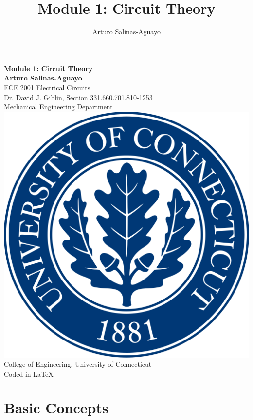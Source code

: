 \documentclass[12pt]{article}
\author{Arturo Salinas-Aguayo}
\title{Module 1: Circuit Theory}
\begin{document}
\newcommand{\closure}[2][3]{%
	{}\mkern#1mu\overline{\mkern-#1mu#2}}
\newcommand\ncoverline[1]{\mkern1mu\overline{\mkern-1mu#1\mkern-1mu}\mkern1mu}
\begin{titlepage}
	\centering
	\vspace*{3cm}
	\huge\textbf{Module 1: Circuit Theory }\\
	\vspace{5cm}
	\Large\textbf{Arturo Salinas-Aguayo}\\
	\normalsize
	ECE 2001 Electrical Circuits\\
	Dr. David J. Giblin, Section 331.660.701.810-1253\\
	Mechanical Engineering Department
	\vfill
	\includegraphics[scale=0.1]{uconnlogo}\\
	College of Engineering, University of Connecticut\\
	\scriptsize{Coded in \LaTeX}
	\vspace*{1cm}
\end{titlepage}
\section*{Basic Concepts}
\end{document}
